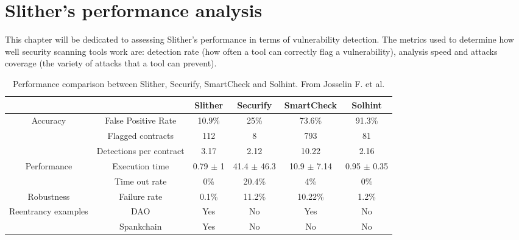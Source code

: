 \chapter{Slither's performance analysis}
This chapter will be dedicated to assessing Slither's performance in terms of vulnerability detection. The metrics used to determine how well security scanning tools work are: detection rate (how often a tool can correctly flag a vulnerability), analysis speed and attacks coverage (the variety of attacks that a tool can prevent).

\begin{table}[h]
\small
\begin{tabular}{cc|cccc|}
\cline{3-6}
                                                           &                         & \multicolumn{1}{c|}{Slither} & \multicolumn{1}{c|}{Securify} & \multicolumn{1}{c|}{SmartCheck} & Solhint       \\ \hline
\multicolumn{1}{|c|}{\multirow{3}{*}{Accuracy}}            & False Positive Rate     & 10.9\%                       & 25\%                          & 73.6\%                          & 91.3\%        \\
\multicolumn{1}{|c|}{}                                     & Flagged contracts       & 112                          & 8                             & 793                             & 81            \\
\multicolumn{1}{|c|}{}                                     & Detections per contract & 3.17                         & 2.12                          & 10.22                           & 2.16          \\ \hline
\multicolumn{1}{|c|}{\multirow{2}{*}{Performance}}         & Execution time  & 0.79 $\pm$ 1                   & 41.4 $\pm$ 46.3  & 10.9 $\pm$ 7.14                   & 0.95 $\pm$ 0.35 \\
\multicolumn{1}{|c|}{}                                     & Time out rate           & 0\%                          & 20.4\%                        & 4\%                             & 0\%           \\ \hline
\multicolumn{1}{|c|}{Robustness}                           & Failure rate            & 0.1\%                        & 11.2\%                        & 10.22\%                         & 1.2\%         \\ \hline
\multicolumn{1}{|c|}{\multirow{2}{*}{Reentrancy examples}} & DAO                     & Yes                          & No                            & Yes                             & No            \\
\multicolumn{1}{|c|}{}                                     & Spankchain              & Yes                          & No                            & No                              & No            \\ \hline
\end{tabular}
\caption{Performance comparison between Slither, Securify, SmartCheck and Solhint. From Josselin F. et al. \cite{slither}}
\label{tab:my-table}
\end{table}


